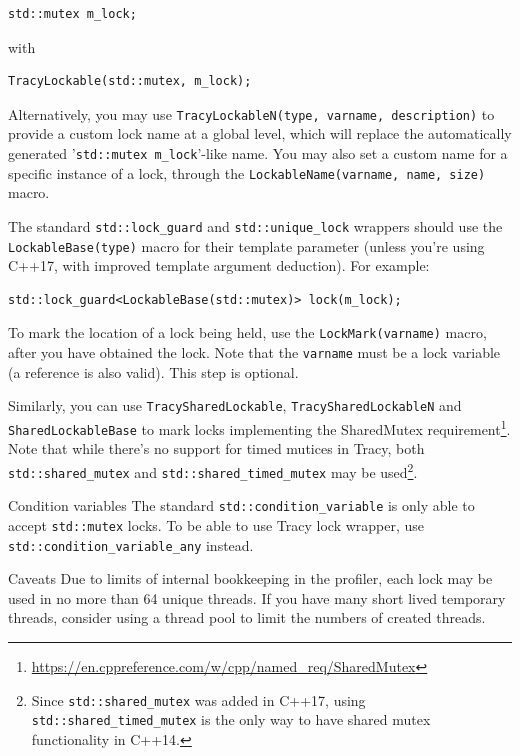 \documentclass[hidelinks,titlepage,a4paper]{article}
\begin{document}
\begin{lstlisting}
std::mutex m_lock;
\end{lstlisting}

with

\begin{lstlisting}
TracyLockable(std::mutex, m_lock);
\end{lstlisting}

Alternatively, you may use \texttt{TracyLockableN(type, varname, description)} to provide a custom lock name at a global level, which will replace the automatically generated '\texttt{std::mutex m\_lock}'-like name. You may also set a custom name for a specific instance of a lock, through the \texttt{LockableName(varname, name, size)} macro.

The standard \texttt{std::lock\_guard} and \texttt{std::unique\_lock} wrappers should use the \texttt{LockableBase(type)} macro for their template parameter (unless you're using C++17, with improved template argument deduction). For example:

\begin{lstlisting}
std::lock_guard<LockableBase(std::mutex)> lock(m_lock);
\end{lstlisting}

To mark the location of a lock being held, use the \texttt{LockMark(varname)} macro, after you have obtained the lock. Note that the \texttt{varname} must be a lock variable (a reference is also valid). This step is optional.

Similarly, you can use \texttt{TracySharedLockable}, \texttt{TracySharedLockableN} and \texttt{SharedLockableBase} to mark locks implementing the SharedMutex requirement\footnote{\url{https://en.cppreference.com/w/cpp/named_req/SharedMutex}}. Note that while there's no support for timed mutices in Tracy, both \texttt{std::shared\_mutex} and \texttt{std::shared\_timed\_mutex} may be used\footnote{Since \texttt{std::shared\_mutex} was added in C++17, using \texttt{std::shared\_timed\_mutex} is the only way to have shared mutex functionality in C++14.}.

\begin{bclogo}[
noborder=true,
couleur=black!5,
logo=\bclampe
]{Condition variables}
The standard \texttt{std::condition\_variable} is only able to accept \texttt{std::mutex} locks. To be able to use Tracy lock wrapper, use \texttt{std::condition\_variable\_any} instead.
\end{bclogo}

\begin{bclogo}[
noborder=true,
couleur=black!5,
logo=\bcattention
]{Caveats}
Due to limits of internal bookkeeping in the profiler, each lock may be used in no more than 64 unique threads. If you have many short lived temporary threads, consider using a thread pool to limit the numbers of created threads.
\end{bclogo}
\end{document}
